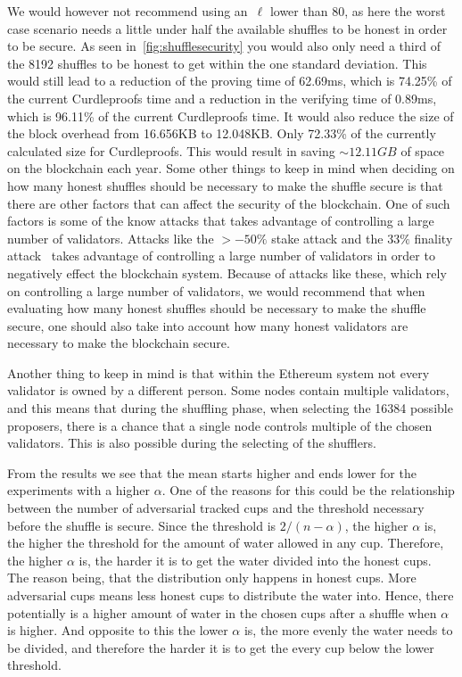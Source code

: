 We would however not recommend using an~$\ell$ lower than 80, as here the worst case scenario needs a little under half the available shuffles to be honest in order to be secure.
As seen in~\autoref{fig:shufflesecurity} you would also only need a third of the 8192 shuffles to be honest to get within the one standard deviation.
This would still lead to a reduction of the proving time of 62.69ms, which is 74.25\% of the current Curdleproofs time and a reduction in the verifying time of 0.89ms, which is 96.11\% of the current Curdleproofs time.
It would also reduce the size of the block overhead from 16.656KB to 12.048KB.
Only 72.33\% of the currently calculated size for Curdleproofs.
This would result in saving $\sim 12.11GB$ of space on the blockchain each year.
Some other things to keep in mind when deciding on how many honest shuffles should be necessary to make the shuffle secure is that there are other factors that can affect the security of the blockchain.
One of such factors is some of the know attacks that takes advantage of controlling a large number of validators.
Attacks like the $>-50\%$ stake attack and the $33\%$ finality attack~\cite{EthereumAttackDefense2024} takes advantage of controlling a large number of validators in order to negatively effect the blockchain system.
Because of attacks like these, which rely on controlling a large number of validators, we would recommend that when evaluating how many honest shuffles should be necessary to make the shuffle secure, one should also take into account how many honest validators are necessary to make the blockchain secure.

Another thing to keep in mind is that within the Ethereum system not every validator is owned by a different person.
Some nodes contain multiple validators, and this means that during the shuffling phase, when selecting the 16384 possible proposers, there is a chance that a single node controls multiple of the chosen validators.
This is also possible during the selecting of the shufflers.

From the results we see that the mean starts higher and ends lower for the experiments with a higher $\alpha$.
One of the reasons for this could be the relationship between the number of adversarial tracked cups and the threshold necessary before the shuffle is secure.
Since the threshold is $2/(n-\alpha)$, the higher $\alpha$ is, the higher the threshold for the amount of water allowed in any cup.
Therefore, the higher $\alpha$ is, the harder it is to get the water divided into the honest cups.
The reason being, that the distribution only happens in honest cups. 
More adversarial cups means less honest cups to distribute the water into.
Hence, there potentially is a higher amount of water in the chosen cups after a shuffle when $\alpha$ is higher. 
And opposite to this the lower $\alpha$ is, the more evenly the water needs to be divided, and therefore the harder it is to get the every cup below the lower threshold.
